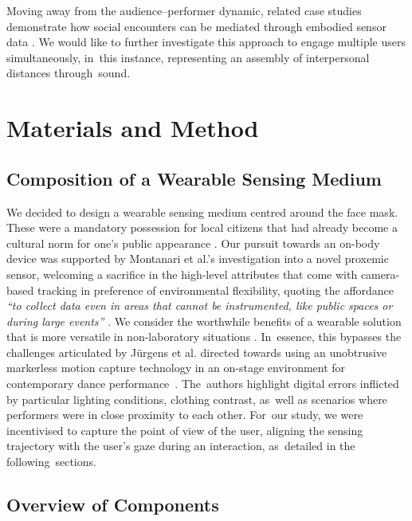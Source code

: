 {Moving away from the audience--performer dynamic, related case studies demonstrate how social encounters can be mediated through embodied sensor data \citep{roo_physio-stacks_2020,howell_life-affirming_2019,ashford_eeg_2019}. We would like to further investigate this approach to engage multiple users simultaneously, in~this instance, representing an assembly of interpersonal distances through~sound.

\section{Materials and Method}
\label{sec3:method}

\subsection*{Composition of a Wearable Sensing Medium}
\label{sec3.1:tech_composition}

We decided to design a wearable sensing medium centred around the face mask. These were a mandatory possession for local citizens that had already become a cultural norm for one’s public appearance \citep{cdc_covid-19_2021}. Our pursuit towards an on-body device was supported by Montanari et al.'s %
investigation into a novel proxemic sensor, welcoming a sacrifice in the high-level attributes that come with camera-based tracking in preference of environmental flexibility, quoting the affordance \textit{``to collect data even in areas that cannot be instrumented, like public spaces or during large events''} \cite{montanari_measuring_2018}. We consider the worthwhile benefits of a wearable solution that is more versatile in non-laboratory situations  \citep{hale_are_2020,solberg_group_2019,hamilton_seeing_2018}. In~essence, this bypasses the challenges articulated by Jürgens et al. %
directed towards using an unobtrusive markerless motion capture technology in an on-stage environment for contemporary dance performance~\cite{jurgens_designing_2020}. The~authors highlight digital errors inflicted by particular lighting conditions, clothing contrast, as~well as scenarios where performers were in close proximity to each other. For~our study, we were incentivised to capture the point of view of the user, aligning the sensing trajectory with the user's gaze during an interaction, as~detailed in the following~sections.

\subsection*{Overview of Components}
\label{sec32}

}
